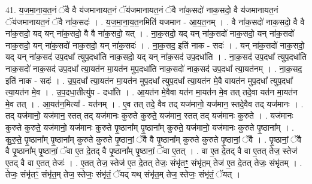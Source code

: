 \documentclass[17pt]{extarticle}
\begin{document}
41. य॒ज॒मा॒ना॒य॒त॒नं ॅवै वै य॑जमानायत॒नं ॅय॑जमानायत॒नं ॅवै ना॑क॒सदो॑ नाक॒सदो॒ वै य॑जमानायत॒नं ॅय॑जमानायत॒नं ॅवै ना॑क॒सदः॑ । . य॒ज॒मा॒ना॒य॒त॒नमिति॑ यजमान - आ॒य॒त॒नम् । . वै ना॑क॒सदो॑ नाक॒सदो॒ वै वै ना॑क॒सदो॒ यद् यन् ना॑क॒सदो॒ वै वै ना॑क॒सदो॒ यत् । . ना॒क॒सदो॒ यद् यन् ना॑क॒सदो॑ नाक॒सदो॒ यन् ना॑क॒सदो॑ नाक॒सदो॒ यन् ना॑क॒सदो॑ नाक॒सदो॒ यन् ना॑क॒सदः॑ । . ना॒क॒सद॒ इति॑ नाक - सदः॑ । . यन् ना॑क॒सदो॑ नाक॒सदो॒ यद् यन् ना॑क॒सद॑ उप॒दधा᳚ त्युप॒दधा॑ति नाक॒सदो॒ यद् यन् ना॑क॒सद॑ उप॒दधा॑ति । . ना॒क॒सद॑ उप॒दधा᳚ त्युप॒दधा॑ति नाक॒सदो॑ नाक॒सद॑ उप॒दधा᳚ त्या॒यत॑न मा॒यत॑न मुप॒दधा॑ति नाक॒सदो॑ नाक॒सद॑ उप॒दधा᳚ त्या॒यत॑नम् । . ना॒क॒सद॒ इति॑ नाक - सदः॑ । . उ॒प॒दधा᳚ त्या॒यत॑न मा॒यत॑न मुप॒दधा᳚ त्युप॒दधा᳚ त्या॒यत॑न मे॒वै वायत॑न मुप॒दधा᳚ त्युप॒दधा᳚ त्या॒यत॑न मे॒व । . उ॒प॒दधा॒तीत्यु॑प - दधा॑ति । . आ॒यत॑न मे॒वैवा यत॑न मा॒यत॑न मे॒व तत् तदे॒वा यत॑न मा॒यत॑न मे॒व तत् । . आ॒यत॑न॒मित्या᳚ - यत॑नम् । . ए॒व तत् तदे॒ वैव तद् यज॑मानो॒ यज॑मान॒ स्तदे॒वैव तद् यज॑मानः । . तद् यज॑मानो॒ यज॑मान॒ स्तत् तद् यज॑मानः कुरुते कुरुते॒ यज॑मान॒ स्तत् तद् यज॑मानः कुरुते । . यज॑मानः कुरुते कुरुते॒ यज॑मानो॒ यज॑मानः कुरुते पृ॒ष्ठाना᳚म् पृ॒ष्ठाना᳚म् कुरुते॒ यज॑मानो॒ यज॑मानः कुरुते पृ॒ष्ठाना᳚म् । . कु॒रु॒ते॒ पृ॒ष्ठाना᳚म् पृ॒ष्ठाना᳚म् कुरुते कुरुते पृ॒ष्ठानां॒ ॅवै वै पृ॒ष्ठाना᳚म् कुरुते कुरुते पृ॒ष्ठानां॒ ॅवै । . पृ॒ष्ठानां॒ ॅवै वै पृ॒ष्ठाना᳚म् पृ॒ष्ठानां॒ ॅवा ए॒त दे॒तद् वै पृ॒ष्ठाना᳚म् पृ॒ष्ठानां॒ ॅवा ए॒तत् । . वा ए॒त दे॒तद् वै वा ए॒तत् तेज॒ स्तेज॑ ए॒तद् वै वा ए॒तत् तेजः॑ । . ए॒तत् तेज॒ स्तेज॑ ए॒त दे॒तत् तेजः॒ संभृ॑तꣳ॒॒ संभृ॑त॒म् तेज॑ ए॒त दे॒तत् तेजः॒ संभृ॑तम् । . तेजः॒ संभृ॑तꣳ॒॒ संभृ॑त॒म् तेज॒ स्तेजः॒ संभृ॑तं॒ ॅयद् यथ् संभृ॑त॒म् तेज॒ स्तेजः॒ संभृ॑तं॒ ॅयत् । \newline
\end{document}
